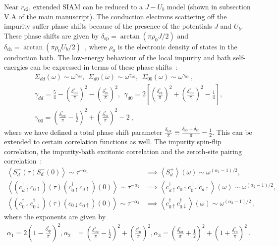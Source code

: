\documentclass{iopart}
\begin{document}
Near \(r_{c2}\), extended SIAM can be reduced to a \(J-U_b\) model (shown in subsection V.A of the main manuscript). The conduction electrons scattering off the impurity suffer phase shifts because of the presence of the potentials \(J\) and \(U_b\). These phase shifts are given by \(\delta_\text{sp} = \arctan\left(\pi \rho_0 J/2\right)\) and \(\delta_\text{ch} = \arctan\left(\pi \rho_0 U_b/2\right)\)~\cite{si_kotliar_1993,giamarchi2004}, where \(\rho_0\) is the electronic density of states in the conduction bath.
The low-energy behaviour of the local impurity and bath self-energies can be expressed in terms of these phase shifts~\cite{si_kotliar_1993}:
\begin{eqnarray}
	\Sigma_{dd}(\omega) \sim \omega^{\gamma_{dd}}, ~ ~ \Sigma_{d0}(\omega) \sim \omega^{\gamma_{d0}}, ~ ~ \Sigma_{00}(\omega) \sim \omega^{\gamma_{00}}~,\nonumber \\
\gamma_{dd} = \frac{5}{4} - \left(\frac{\delta^*_\text{tot}}{\pi}\right)^2 - \left(\frac{\delta^*_\text{ch}}{\pi}\right)^2, ~ ~ \gamma_{d0} = 2\left[\left( \frac{\delta^*_\text{ch}}{\pi} \right)^2 + \left(\frac{\delta^*_\text{tot}}{\pi}\right)^2 - \frac{1}{4}\right], \nonumber\\
\gamma_{00} = \left(\frac{\delta^*_\text{tot}}{\pi} - \frac{1}{2}\right)^2 + \left(\frac{\delta^*_\text{ch}}{\pi} \right)^2 - 2~,
\end{eqnarray}
where we have defined a total phase shift parameter \(\frac{\delta_\text{tot}}{\pi} \equiv \frac{\delta_\text{sp} + \delta_\text{ch}}{\pi} - \frac{1}{2}\).
This can be extended to certain correlation functions as well. The impurity spin-flip correlation, the impurity-bath excitonic correlation and the zeroth-site pairing correlation~\cite{si_kotliar_1993}:
\begin{eqnarray}
	\left<S_d^+(\tau) S_d^-(0) \right>\sim \tau^{-\alpha_1} &\implies \left<S_d^+\right>(\omega) \sim \omega^{(\alpha_1 - 1)/2},  \nonumber\\
	\left<(c^\dagger_{d \uparrow} c_{0 \uparrow})(\tau) (c^\dagger_{0 \uparrow} c_{d \uparrow})(0)\right>\sim \tau^{-\alpha_2} &\implies \left<c^\dagger_{d \uparrow} c_{0 \uparrow} c^\dagger_{0 \uparrow} c_{d \uparrow}\right>(\omega) \sim \omega^{(\alpha_2 - 1)/2},  \nonumber \\
	\left<(c^\dagger_{0 \uparrow} c^\dagger_{0 \downarrow})(\tau) (c_{0 \downarrow} c_{0 \uparrow})(0)\right> \sim \tau^{-\alpha_3} &\implies \left<c^\dagger_{0 \uparrow} c^\dagger_{ 0\downarrow}\right>(\omega) \sim \omega^{(\alpha_3 - 1)/2}~,
\end{eqnarray}
where the exponents are given by
\begin{eqnarray}
	\alpha_1 = 2\left(1 - \frac{\delta_\text{sp}^*}{\pi}\right)^2, \alpha_2 &= \left(\frac{\delta^*_\text{tot}}{\pi} - \frac{1}{2}\right)^2 + \left(\frac{\delta^*_\text{ch}}{\pi} \right)^2,  \alpha_3 = \left(\frac{\delta^*_\text{tot}}{\pi} + \frac{1}{2}\right)^2 + \left(1 + \frac{\delta^*_\text{ch}}{\pi} \right)^2~.
\end{eqnarray}
\end{document}
